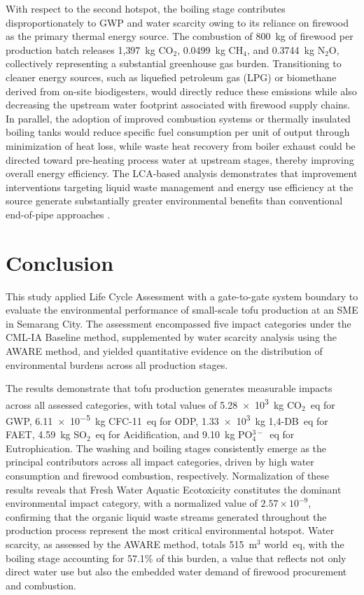 \documentclass[12pt,a4paper]{article}
\begin{document}
With respect to the second hotspot, the boiling stage contributes disproportionately to GWP and water
scarcity owing to its reliance on firewood as the primary thermal energy source. The combustion of
800~kg of firewood per production batch releases 1{,}397~kg CO$_2$, 0.0499~kg CH$_4$, and
0.3744~kg N$_2$O, collectively representing a substantial greenhouse gas burden. Transitioning to
cleaner energy sources, such as liquefied petroleum gas (LPG) or biomethane derived from on-site
biodigesters, would directly reduce these emissions while also decreasing the upstream water footprint
associated with firewood supply chains. In parallel, the adoption of improved combustion systems or
thermally insulated boiling tanks would reduce specific fuel consumption per unit of output through
minimization of heat loss, while waste heat recovery from boiler exhaust could be directed toward
pre-heating process water at upstream stages, thereby improving overall energy efficiency. The
LCA-based analysis demonstrates that improvement interventions targeting liquid waste management and
energy use efficiency at the source generate substantially greater environmental benefits than
conventional end-of-pipe approaches \citep{Bjornbet2021, Apriyanti2025}.

\section{Conclusion}

This study applied Life Cycle Assessment with a gate-to-gate system boundary to evaluate the
environmental performance of small-scale tofu production at an SME in Semarang City. The assessment
encompassed five impact categories under the CML-IA Baseline method, supplemented by water scarcity
analysis using the AWARE method, and yielded quantitative evidence on the distribution of environmental
burdens across all production stages.

The results demonstrate that tofu production generates measurable impacts across all assessed
categories, with total values of \num{5.28e3}~kg CO$_2$~eq for GWP, \num{6.11e-5}~kg CFC-11~eq for
ODP, \num{1.33e3}~kg 1,4-DB~eq for FAET, 4.59~kg SO$_2$~eq for Acidification, and
9.10~kg PO$_4^{3-}$~eq for Eutrophication. The washing and boiling stages consistently emerge as the
principal contributors across all impact categories, driven by high water consumption and firewood
combustion, respectively. Normalization of these results reveals that Fresh Water Aquatic Ecotoxicity
constitutes the dominant environmental impact category, with a normalized value of
$2.57\times10^{-9}$, confirming that the organic liquid waste streams generated throughout the
production process represent the most critical environmental hotspot. Water scarcity, as assessed by
the AWARE method, totals 515~m$^3$ world~eq, with the boiling stage accounting for 57.1\% of this
burden, a value that reflects not only direct water use but also the embedded water demand of firewood
procurement and combustion.
\end{document}
